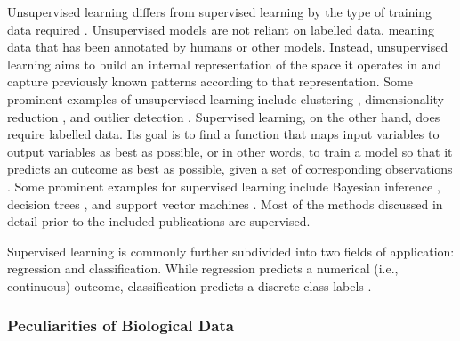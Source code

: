 Unsupervised \label{%
mar:supunsup} learning differs from supervised learning by the type of
training data required \citep{Hinton1999}. Unsupervised  models are not
reliant on labelled data, meaning data that has been annotated by humans or
other models. Instead, unsupervised learning aims to build an internal
representation of the space it operates in and capture previously known
patterns according to that representation. Some prominent examples of
unsupervised learning include clustering \citep{Rokach2005}, dimensionality
reduction \citep{VanDerMaaten2009}, and outlier detection \citep{Hawkins1980}.
Supervised learning, on the other hand, does require labelled data. Its goal
is to find a function that maps input variables to output variables as best as
possible, or in other words, to train a model so that it predicts an outcome
as best as possible, given a set of corresponding observations \citep{%
Mohri2018}. Some prominent examples for supervised learning include Bayesian 
inference \citep{Gelman2014}, decision trees \citep{Kaminski2018}, and support 
vector machines \citep{Cortes1995}. Most of the methods discussed in detail
prior to the included publications are supervised.

Supervised learning is commonly further subdivided into two fields of
application: regression and classification. While regression predicts a
numerical (i.e., continuous) outcome, classification predicts a discrete class
labels \citep{James2009}.

\subsubsection{Peculiarities of Biological Data}\label{subsec:biodata}









































